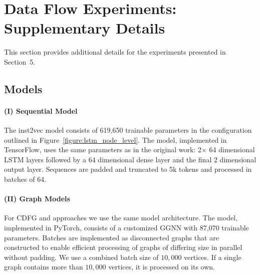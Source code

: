 \section{Data Flow Experiments: Supplementary Details}

This section provides additional details for the experiments presented in
Section~5.

\subsection{Models}

\paragraph{(I) Sequential Model} The inst2vec model consists of 619,650
trainable parameters in the  configuration outlined in
Figure~\ref{figure:lstm_node_level}. The model, implemented in TensorFlow, uses
the same parameters as in the original work: 2$\times$ 64 dimensional LSTM
layers followed by a 64 dimensional dense layer and the final 2 dimensional
output layer. Sequences are padded and truncated to 5k tokens and processed in
batches of 64.

\paragraph{(II) Graph Models} For CDFG and \programl approaches we use the same
model architecture. The model, implemented in PyTorch, consists of a customized
GGNN with 87,070 trainable parameters. Batches are implemented as disconnected
graphs that are constructed to enable efficient processing of graphs of
differing size in parallel without padding. We use a combined batch size of
$10,000$ vertices. If a single graph contains more than $10,000$ vertices, it is
processed on its own.

